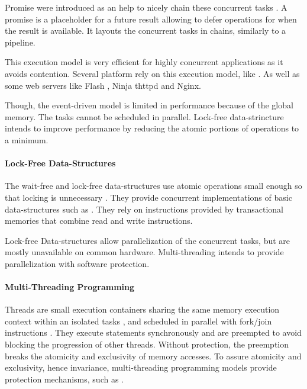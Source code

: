 Promise were introduced as an help to nicely chain these concurrent tasks \cite{Liskov1988}.
A promise is a placeholder for a future result allowing to defer operations for when the result is available.
It layouts the concurrent tasks in chains, similarly to a pipeline.

This execution model is very efficient for highly concurrent applications as it avoids contention.
Several platform rely on this execution model, like .
As well as some web servers like Flash \cite{Pai1999}, Ninja \cite{Gribble2001} thttpd and Nginx.

Though, the event-driven model is limited in performance because of the global memory.
The tasks cannot be scheduled in parallel.
Lock-free data-strincture intends to improve performance by reducing the atomic portions of operations to a minimum.

\paragraph{Lock-Free Data-Structures}

The wait-free and lock-free data-structures use atomic operations small enough so that locking is unnecessary \cite{Lamport1977,Herlihy1988,Herlihy1990,Herlihy1991,Anderson1990}.
They provide concurrent implementations of basic data-structures such as .
They rely on instructions provided by transactional memories \cite{Harris2010} that combine read and write instructions.

Lock-free Data-structures allow parallelization of the concurrent tasks, but are mostly unavailable on common hardware.
Multi-threading intends to provide parallelization with software protection.

\paragraph{Multi-Threading Programming}

Threads are small execution containers sharing the same memory execution context within an isolated tasks \cite{Dijkstra1968}, and scheduled in parallel with fork/join instructions \cite{Randall1998,Frigo1998,Leiserson2010}.
They execute statements synchronously and are preempted to avoid blocking the progression of other threads.
Without protection, the preemption breaks the atomicity and exclusivity of memory accesses.
To assure atomicity and exclusivity, hence invariance, multi-threading programming models provide protection mechanisms, such as .

